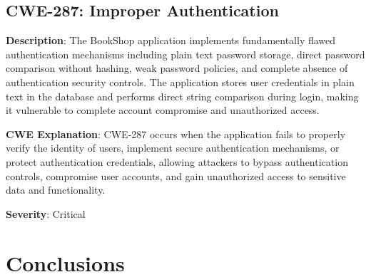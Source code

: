 \documentclass[]{UCD_CS_FYP_Report}
\begin{document}
\section{CWE-287: Improper Authentication}

\textbf{Description}: The BookShop application implements fundamentally flawed authentication mechanisms including plain text password storage, direct password comparison without hashing, weak password policies, and complete absence of authentication security controls. The application stores user credentials in plain text in the database and performs direct string comparison during login, making it vulnerable to complete account compromise and unauthorized access.

\textbf{CWE Explanation}: CWE-287 occurs when the application fails to properly verify the identity of users, implement secure authentication mechanisms, or protect authentication credentials, allowing attackers to bypass authentication controls, compromise user accounts, and gain unauthorized access to sensitive data and functionality.

\textbf{Severity}: Critical


\chapter{Conclusions}
\end{document}
